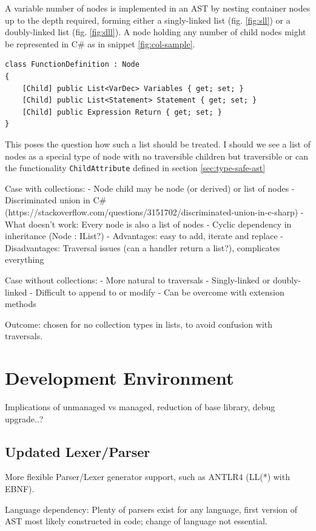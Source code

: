 \documentclass[twoside,openright]{uva-bachelor-thesis}
\newcommand{\code}[1]{\texttt{\footnotesize#1}}
\begin{document}
		A variable number of nodes is implemented in an AST by nesting container nodes up to the depth required, forming either a singly-linked list (fig. \ref{fig:sll}) or a doubly-linked list (fig. \ref{fig:dll}). A node holding any number of child nodes might be represented in C\# as in snippet \ref{fig:col-sample}.
		
		\begin{lstlisting}[caption=Example of list attributes in a function definition,label=fig:col-sample]
class FunctionDefinition : Node 
{
	[Child] public List<VarDec> Variables { get; set; }
	[Child] public List<Statement> Statement { get; set; }
	[Child] public Expression Return { get; set; }
}
		\end{lstlisting}
	
		This poses the question how such a list should be treated. I should we see a list of nodes as a special type of node with no traversible children but traversible or can the functionality  \code{ChildAttribute} defined in section \ref{sec:type-safe-ast} 
		
		Case with collections:
		- Node child may be node (or derived) or list of nodes
		- Discriminated union in C\# (https://stackoverflow.com/questions/3151702/discriminated-union-in-c-sharp)
		- What doesn't work: Every node is also a list of nodes
		- Cyclic dependency in inheritance (Node : IList?)
		- Advantages: easy to add, iterate and replace
		- Disadvantages: Traversal issues (can a handler return a list?), complicates everything
		
		Case without collections:
		- More natural to traversals
		- Singly-linked or doubly-linked
		- Difficult to append to or modify
		- Can be overcome with extension methods
		
		Outcome: chosen for no collection types in lists, to avoid confusion with traversals.
			
	\section{Development Environment}
		Implications of unmanaged vs managed, reduction of base library, debug upgrade..?
		
		\subsection{Updated Lexer/Parser}
			More flexible Parser/Lexer generator support, such as ANTLR4 (LL(*) with EBNF).
						
			Language dependency: Plenty of parsers exist for any language, first version of AST most likely constructed in code; change of language not essential.
			
\end{document}
